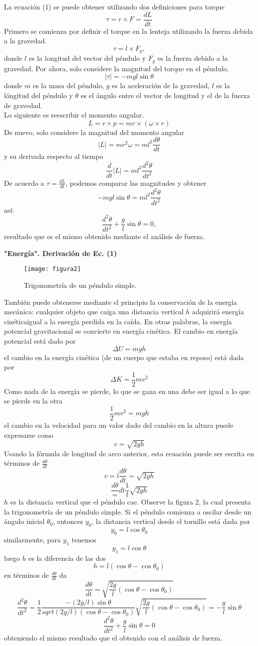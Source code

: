 \documentclass[12pt]{article}
\begin{document}
La ecuación (1) se puede obtener utilizando dos definiciones para torque
$$\tau=r\times F=\frac{dL}{dt}$$
Primero se comienza por definir el torque en la lenteja utilizando la fuerza debida a la gravedad.
$$\tau=l\times F_g,$$
donde $l$ es la longitud del vector del péndulo y $F_g$ es la fuerza debido a la gravedad. Por ahora, solo considere la magnitud del torque en el péndulo.
$$|\tau|=-mgl\sin\theta$$
donde $m$ es la masa del péndulo, $g$ es la aceleración de la gravedad, $l$ es la lóngitud del péndulo y $\theta$ es el ángulo entre el vector de longitud y el de la fuerza de gravedad.\\
Lo siguiente es reescribir el momento angular.
$$L=r\times p=mr\times(\omega\times r)$$
De nuevo, solo considere la magnitud del momento angular
$$|L|=mr^2\omega=ml^2\frac{d\theta}{dt}$$
y su derivada respecto al tiempo
$$\frac{d}{dt}|L|=ml^2\frac{d^2\theta}{dt^2}$$
De acuerdo a $\tau=\frac{dL}{dt}$, podemos comparar las magnitudes y obtener
$$-mgl\sin\theta=ml^2\frac{d^2\theta}{dt^2}$$
así:
$$\frac{d^2\theta}{dt^2}+\frac{g}{l}\sin\theta=0,$$
resultado que es el mismo obtenido mediante el análisis de fuerza.

\textbf{"Energía". Derivación de Ec. (1)}

\begin{figure}[H]
\centering
\texttt{[image: figura2]}
\caption{Trigonometría de un péndulo simple.}
\end{figure}

También puede obtenerse mediante el principio la conservación de la energía mecánica: cualquier objeto que caiga una distancia vertical $h$ adquirirá energía cinéticaigual a la energía perdida en la caída. En otras palabras, la energía potencial gravitacional se convierte en energía cinética. El cambio en energía potencial está dado por
$$\Delta U=mgh$$
el cambio en la energía cinética (de un cuerpo que estaba en reposo) está dada por
$$\Delta K =\frac{1}{2}mv^2$$
Como nada de la energía se pierde, lo que se gana en una debe ser igual a lo que se pierde en la otra
$$\frac{1}{2}mv^2=mgh$$
el cambio en la velocidad para un valor dado del cambio en la altura puede expresarse como
$$v=\sqrt{2gh}$$
Usando la fórmula de longitud de arco anterior, esta ecuación puede ser escrita en términos de $\frac{d\theta}{dt}$
$$v=l\frac{d\theta}{dt}=\sqrt{2gh}$$
$$\frac{d\theta}={dt}\frac{1}{l}\sqrt{2gh}$$
$h$ es la distancia vertical que el péndulo cae. Observe la figura 2, la cual presenta la trigonometría de un péndulo simple. Si el péndulo comienza a oscilar desde un ángulo inicial $\theta_0$, entonces $y_0$, la distancia vertical desde el tornillo está dada por
$$y_0=l\cos\theta_0$$
similarmente, para $y_1$ tenemos
$$y_1=l\cos\theta$$
luego $h$ es la diferencia de las dos
$$h=l(\cos\theta-\cos\theta_0)$$
en términos de $\frac{d\theta}{dt}$ da
\begin{equation}
\frac{d\theta}{dt}=\sqrt{\frac{2g}{l}(\cos\theta-\cos\theta_0)}
\end{equation}
$$\frac{d^2\theta}{dt^2}=\frac{1}{2}\frac{-(2g/l)\sin\theta}{sqrt{(2g/l)(\cos\theta-\cos\theta_0)}}\sqrt{\frac{2g}{l}(\cos\theta-\cos\theta_0)}=-\frac{g}{l}\sin\theta$$
$$\frac{d^2\theta}{dt^2}+\frac{g}{l}\sin\theta=0$$
obteniendo el mismo resultado que el obtenido con el análisis de fuerza.
\end{document}
